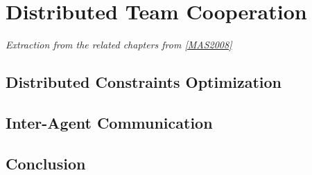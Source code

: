 \chapter{Distributed Team Cooperation}
\emph{Extraction from the related chapters from \ref{MAS2008}}
\section{Distributed Constraints Optimization}

\section{Inter-Agent Communication}
\section{Conclusion}
